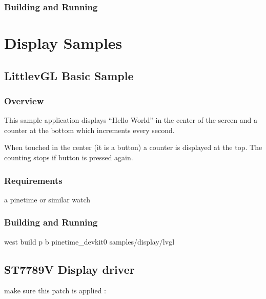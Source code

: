 \documentclass[letterpaper,10pt,english]{sphinxmanual}
\begin{document}
\subsubsection{Building and Running}
\label{\detokenize{samples/drivers/i2c_scanner/README:building-and-running}}

\section{Display Samples}
\label{\detokenize{samples/display/display:display-samples}}\label{\detokenize{samples/display/display:id1}}\label{\detokenize{samples/display/display::doc}}

\subsection{LittlevGL Basic Sample}
\label{\detokenize{samples/display/lvgl/README:littlevgl-basic-sample}}\label{\detokenize{samples/display/lvgl/README:lvgl-sample}}\label{\detokenize{samples/display/lvgl/README::doc}}

\subsubsection{Overview}
\label{\detokenize{samples/display/lvgl/README:overview}}
This sample application displays “Hello World” in the center of the screen
and a counter at the bottom which increments every second.

When touched in the center (it is a button) a counter is displayed at the top.
The counting stops if button is pressed again.


\subsubsection{Requirements}
\label{\detokenize{samples/display/lvgl/README:requirements}}
a pinetime or similar watch


\subsubsection{Building and Running}
\label{\detokenize{samples/display/lvgl/README:building-and-running}}
west build \sphinxhyphen{}p \sphinxhyphen{}b pinetime\_devkit0 samples/display/lvgl


\subsection{ST7789V Display driver}
\label{\detokenize{samples/display/st7789v/README:st7789v-display-driver}}\label{\detokenize{samples/display/st7789v/README:st7789v-sample}}\label{\detokenize{samples/display/st7789v/README::doc}}
make sure this patch is applied :
\end{document}
